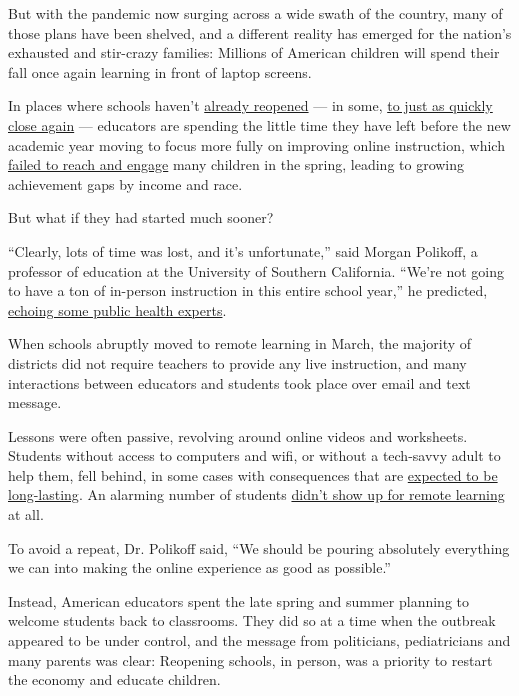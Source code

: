 But with the pandemic now surging across a wide swath of the country,
many of those plans have been shelved, and a different reality has
emerged for the nation's exhausted and stir-crazy families: Millions of
American children will spend their fall once again learning in front of
laptop screens.

In places where schools haven't
\href{https://www.nytimes3xbfgragh.onion/2020/08/06/us/coronavirus-students.html}{already
reopened} --- in some,
\href{https://www.nytimes3xbfgragh.onion/2020/08/03/us/school-closing-coronavirus.html}{to
just as quickly close again} --- educators are spending the little time
they have left before the new academic year moving to focus more fully
on improving online instruction, which
\href{https://www.nytimes3xbfgragh.onion/2020/06/05/us/coronavirus-education-lost-learning.html}{failed
to reach and engage} many children in the spring, leading to growing
achievement gaps by income and race.

But what if they had started much sooner?

``Clearly, lots of time was lost, and it's unfortunate,'' said Morgan
Polikoff, a professor of education at the University of Southern
California. ``We're not going to have a ton of in-person instruction in
this entire school year,'' he predicted,
\href{https://www.nytimes3xbfgragh.onion/2020/08/03/us/school-closing-coronavirus.html}{echoing
some public health experts}.

When schools abruptly moved to remote learning in March, the majority of
districts did not require teachers to provide any live instruction, and
many interactions between educators and students took place over email
and text message.

Lessons were often passive, revolving around online videos and
worksheets. Students without access to computers and wifi, or without a
tech-savvy adult to help them, fell behind, in some cases with
consequences that are
\href{https://www.nytimes3xbfgragh.onion/2020/06/05/us/coronavirus-education-lost-learning.html}{expected
to be long-lasting}. An alarming number of students
\href{https://www.nytimes3xbfgragh.onion/2020/04/06/us/coronavirus-schools-attendance-absent.html}{didn't
show up for remote learning} at all.

To avoid a repeat, Dr. Polikoff said, ``We should be pouring absolutely
everything we can into making the online experience as good as
possible.''

Instead, American educators spent the late spring and summer planning to
welcome students back to classrooms. They did so at a time when the
outbreak appeared to be under control, and the message from politicians,
pediatricians and many parents was clear: Reopening schools, in person,
was a priority to restart the economy and educate children.

